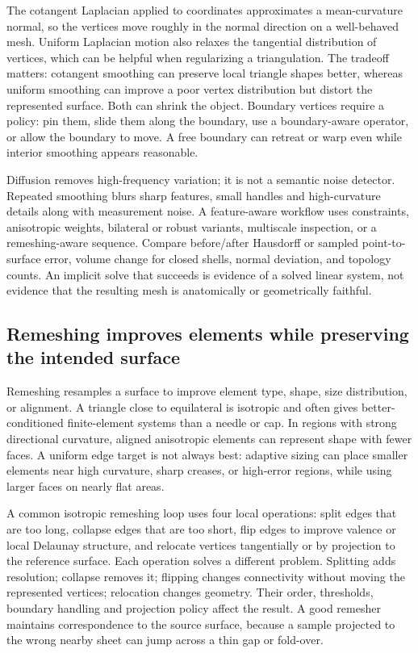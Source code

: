 The cotangent Laplacian applied to coordinates approximates a mean-curvature normal, so the vertices move roughly in the normal direction on a well-behaved mesh. Uniform Laplacian motion also relaxes the tangential distribution of vertices, which can be helpful when regularizing a triangulation. The tradeoff matters: cotangent smoothing can preserve local triangle shapes better, whereas uniform smoothing can improve a poor vertex distribution but distort the represented surface. Both can shrink the object. Boundary vertices require a policy: pin them, slide them along the boundary, use a boundary-aware operator, or allow the boundary to move. A free boundary can retreat or warp even while interior smoothing appears reasonable.

Diffusion removes high-frequency variation; it is not a semantic noise detector. Repeated smoothing blurs sharp features, small handles and high-curvature details along with measurement noise. A feature-aware workflow uses constraints, anisotropic weights, bilateral or robust variants, multiscale inspection, or a remeshing-aware sequence. Compare before/after Hausdorff or sampled point-to-surface error, volume change for closed shells, normal deviation, and topology counts. An implicit solve that succeeds is evidence of a solved linear system, not evidence that the resulting mesh is anatomically or geometrically faithful.

\subsection{Remeshing improves elements while preserving the intended surface}\label{03-visual-computing-i-ch002-remeshing-improves-elements-while-preserving-the-intended-surface}

Remeshing resamples a surface to improve element type, shape, size distribution, or alignment. A triangle close to equilateral is isotropic and often gives better-conditioned finite-element systems than a needle or cap. In regions with strong directional curvature, aligned anisotropic elements can represent shape with fewer faces. A uniform edge target is not always best: adaptive sizing can place smaller elements near high curvature, sharp creases, or high-error regions, while using larger faces on nearly flat areas.

A common isotropic remeshing loop uses four local operations: split edges that are too long, collapse edges that are too short, flip edges to improve valence or local Delaunay structure, and relocate vertices tangentially or by projection to the reference surface. Each operation solves a different problem. Splitting adds resolution; collapse removes it; flipping changes connectivity without moving the represented vertices; relocation changes geometry. Their order, thresholds, boundary handling and projection policy affect the result. A good remesher maintains correspondence to the source surface, because a sample projected to the wrong nearby sheet can jump across a thin gap or fold-over.

